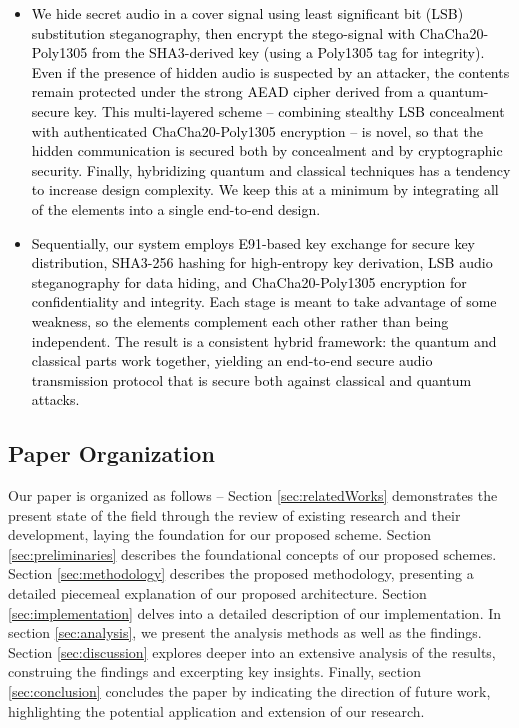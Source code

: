 \documentclass[a4paper]{cas-sc}
\begin{document}
\begin{itemize}
    \item \textcolor{black}{We hide secret audio in a cover signal using least significant bit (LSB) substitution steganography, then encrypt the stego-signal with ChaCha20-Poly1305 from the SHA3-derived key (using a Poly1305 tag for integrity). Even if the presence of hidden audio is suspected by an attacker, the contents remain protected under the strong AEAD cipher derived from a quantum-secure key. This multi-layered scheme -- combining stealthy LSB concealment with authenticated ChaCha20-Poly1305 encryption -- is novel, so that the hidden communication is secured both by concealment and by cryptographic security. Finally, hybridizing quantum and classical techniques has a tendency to increase design complexity. We keep this at a minimum by integrating all of the elements into a single end-to-end design.}

    \item \textcolor{black}{Sequentially, our system employs E91-based key exchange for secure key distribution, SHA3-256 hashing for high-entropy key derivation, LSB audio steganography for data hiding, and ChaCha20-Poly1305 encryption for confidentiality and integrity. Each stage is meant to take advantage of some weakness, so the elements complement each other rather than being independent. The result is a consistent hybrid framework: the quantum and classical parts work together, yielding an end-to-end secure audio transmission protocol that is secure both against classical and quantum attacks.}
\end{itemize}
\subsection{Paper Organization}
Our paper is organized as follows -- Section \ref{sec:relatedWorks} demonstrates the present state of the field through the review of existing research and their development, laying the foundation for our proposed scheme. Section \ref{sec:preliminaries} describes the foundational concepts of our proposed schemes. Section \ref{sec:methodology} describes the proposed methodology, presenting a detailed piecemeal explanation of our proposed architecture. Section \ref{sec:implementation} delves into a detailed description of our implementation. In section \ref{sec:analysis}, we present the analysis methods as well as the findings. Section \ref{sec:discussion} explores deeper into an extensive analysis of the results, construing the findings and excerpting key insights. Finally, section \ref{sec:conclusion} concludes the paper by indicating the direction of future work, highlighting the potential application and extension of our research.
\end{document}
